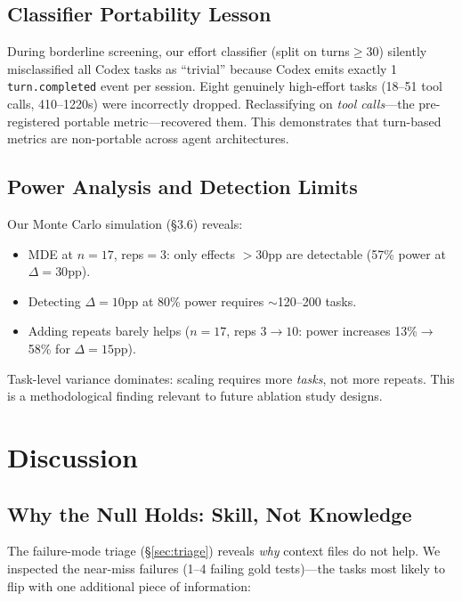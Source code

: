\documentclass[11pt]{article}
\begin{document}
\subsection{Classifier Portability Lesson}
\label{sec:classifier}

During borderline screening, our effort classifier (split on turns${\geq}$30) silently misclassified all Codex tasks as ``trivial'' because Codex emits exactly 1 \texttt{turn.completed} event per session.
Eight genuinely high-effort tasks (18--51 tool calls, 410--1220s) were incorrectly dropped.
Reclassifying on \emph{tool calls}---the pre-registered portable metric---recovered them.
This demonstrates that turn-based metrics are non-portable across agent architectures.

\subsection{Power Analysis and Detection Limits}
\label{sec:power}

Our Monte Carlo simulation (\S3.6) reveals:
\begin{itemize}
    \item MDE at $n{=}17$, reps$=$3: only effects $>$30pp are detectable (57\% power at $\Delta{=}30$pp).
    \item Detecting $\Delta{=}10$pp at 80\% power requires ${\sim}$120--200 tasks.
    \item Adding repeats barely helps ($n{=}17$, reps $3{\to}10$: power increases 13\%${\to}$58\% for $\Delta{=}15$pp).
\end{itemize}

Task-level variance dominates: scaling requires more \emph{tasks}, not more repeats.
This is a methodological finding relevant to future ablation study designs.

\section{Discussion}

\subsection{Why the Null Holds: Skill, Not Knowledge}

The failure-mode triage (\S\ref{sec:triage}) reveals \emph{why} context files do not help.
We inspected the near-miss failures (1--4 failing gold tests)---the tasks most likely to flip with one additional piece of information:
\end{document}
